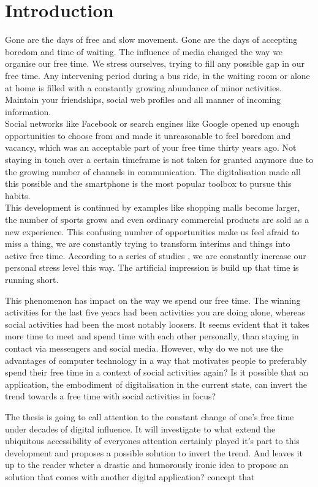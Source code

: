 \documentclass[12pt,numbers=noenddot,parskip,bibliography=totocnumbered,listof=totocnumbered]{scrreprt}
\begin{document}
\chapter{Introduction}
Gone are the days of free and slow movement. Gone are the days of accepting boredom and time of waiting. The influence of media changed the way we organise our free time. We stress ourselves, trying to fill any possible gap in our free time. Any intervening period during a bus ride, in the waiting room or alone at home is filled with a constantly growing abundance of minor activities. Maintain your friendships, social web profiles and all manner of incoming information. \\
Social networks like Facebook or search engines like Google opened up enough opportunities to choose from and made it unreasonable to feel boredom and vacancy, which was an acceptable part of your free time thirty years ago. Not staying in touch over a certain timeframe is not taken for granted anymore due to the growing number of channels in communication. The digitalisation made all this possible and the smartphone is the most popular toolbox to pursue this habits. \\
This development is continued by examples like shopping malls become larger, the number of sports grows and even ordinary commercial products are sold as a new experience. This confusing number of opportunities make us feel afraid to miss a thing, we are constantly trying to transform interims and things into active free time. According to a series of studies \citep{freizeitmonitor}, we are constantly increase our personal stress level this way. The artificial impression is build up that time is running short. 

This phenomenon has impact on the way we spend our free time. The winning activities for the last five years had been activities you are doing alone, whereas social activities had been the most notably loosers. It seems evident that it takes more time to meet and spend time with each other personally, than staying in contact via messengers and social media. However, why do we not use the advantages of computer technology in a way that motivates people to preferably spend their free time in a context of social activities again? Is it possible that an application, the embodiment of digitalisation in the current state, can invert the trend towards a free time with social activities in focus?

The thesis is going to call attention to the constant change of one's free time under decades of digital influence. It will investigate to what extend the ubiquitous accessibility of everyones attention certainly played it's part to this development and proposes a possible solution to invert the trend. And leaves it up to the reader wheter  a drastic and humorously ironic idea to propose an solution that comes with another digital application?  concept that 
\end{document}
